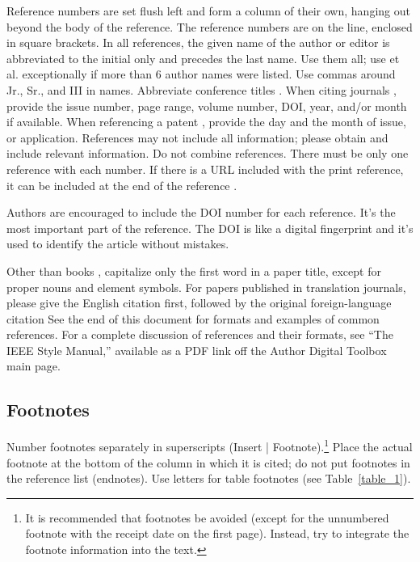 \documentclass[journal]{IEEEtranTIE}
\begin{document}
Reference numbers are set flush left and form a column of their own, hanging out beyond the body of the reference. The reference numbers are on the line, enclosed in square brackets. In all references, the given name of the author or editor is abbreviated to the initial only and precedes the last name. Use them all; use et al. exceptionally if more than 6 author names were listed. Use commas around Jr., Sr., and III in names. Abbreviate conference titles \cite{inproceedings1}.  When citing journals \cite{article1, article2, article3, article4, article5, article6, article7, article8, article9, article10}, provide the issue number, page range, volume number, DOI, year, and/or month if available. When referencing a patent \cite{patent1}, provide the day and the month of issue, or application. References may not include all information; please obtain and include relevant information. Do not combine references. There must be only one reference with each number. If there is a URL included with the print reference, it can be included at the end of the reference \cite{onlinebook1}.

Authors are encouraged to include the DOI number for each reference. It's the most important part of the reference. The DOI is like a digital fingerprint and it's used to identify the article without mistakes.

Other than books \cite{inbook1, book1, book2, book3}, capitalize only the first word in a paper title, except for proper nouns and element symbols. For papers published in translation journals, please give the English citation first, followed by the original foreign-language citation See the end of this document for formats and examples of common references. For a complete discussion of references and their formats, see ``The IEEE Style Manual,'' available as a PDF link off the Author Digital Toolbox main page.

\subsection{Footnotes}
Number footnotes separately in superscripts (Insert | Footnote).\footnote{It is recommended that footnotes be avoided (except for the unnumbered footnote with the receipt date on the first page). Instead, try to integrate the footnote information into the text.}  Place the actual footnote at the bottom of the column in which it is cited; do not put footnotes in the reference list (endnotes). Use letters for table footnotes  (see \mbox{Table \ref{table_1}}).
\end{document}
